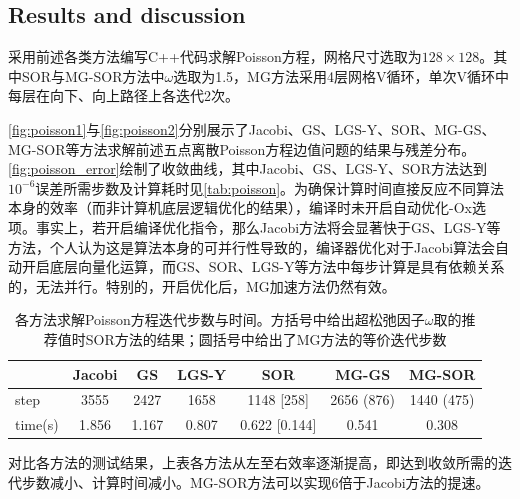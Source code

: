 \documentclass[11pt]{article}
\begin{document}
\subsection{Results and discussion}
采用前述各类方法编写C++代码求解Poisson方程，网格尺寸选取为$128\times128$。其中SOR与MG-SOR方法中$\omega$选取为1.5，MG方法采用4层网格V循环，单次V循环中每层在向下、向上路径上各迭代2次\citep{Li96}。

\autoref{fig:poisson1}与\autoref{fig:poisson2}分别展示了Jacobi、GS、LGS-Y、SOR、MG-GS、MG-SOR等方法求解前述五点离散Poisson方程边值问题的结果与残差分布。\autoref{fig:poisson_error}绘制了收敛曲线，其中Jacobi、GS、LGS-Y、SOR方法达到$10^{-6}$误差所需步数及计算耗时见\autoref{tab:poisson}。为确保计算时间直接反应不同算法本身的效率（而非计算机底层逻辑优化的结果），编译时未开启自动优化-Ox选项。事实上，若开启编译优化指令，那么Jacobi方法将会显著快于GS、LGS-Y等方法，个人认为这是算法本身的可并行性导致的，编译器优化对于Jacobi算法会自动开启底层向量化运算，而GS、SOR、LGS-Y等方法中每步计算是具有依赖关系的，无法并行。特别的，开启优化后，MG加速方法仍然有效。

\begin{table}[htbp]
	\centering
	\caption{\label{tab:poisson}各方法求解Poisson方程迭代步数与时间。方括号中给出超松弛因子$\omega$取\citet{brazier_optimum_1974}的推荐值时SOR方法的结果；圆括号中给出了MG方法的等价迭代步数}\vspace{1ex}
	\begin{tabular}{lcccccc}
		\toprule
		        & Jacobi & GS    & LGS-Y & SOR           & MG-GS      & MG-SOR     \\
		\midrule
		step    & 3555   & 2427  & 1658  & 1148 [258]    & 2656 (876) & 1440 (475) \\
		time(s) & 1.856  & 1.167 & 0.807 & 0.622 [0.144] & 0.541      & 0.308      \\
		\bottomrule
	\end{tabular}
\end{table}

对比各方法的测试结果，上表各方法从左至右效率逐渐提高，即达到收敛所需的迭代步数减小、计算时间减小。MG-SOR方法可以实现6倍于Jacobi方法的提速。
\end{document}
